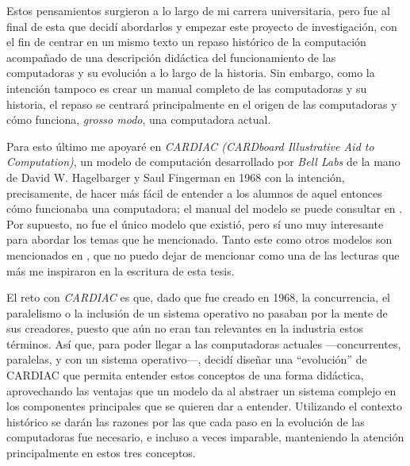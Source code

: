\documentclass[letterpaper,12pt,oneside]{book}
\begin{document}
	Estos pensamientos surgieron a lo largo de mi carrera universitaria, pero fue al final de esta que decidí abordarlos y empezar este proyecto de investigación,
	con el fin de centrar en un mismo texto un repaso histórico de la computación acompañado de una descripción didáctica del funcionamiento de las computadoras
	y su evolución a lo largo de la historia. Sin embargo, como la intención tampoco es crear un manual completo de las computadoras y su historia, el repaso
	se centrará principalmente en el origen de las computadoras y cómo funciona, \textit{grosso modo}, una computadora actual.
 
    Para esto último me apoyaré
	en \textit{CARDIAC (CARDboard Illustrative Aid to Computation)}, un modelo de computación 
	desarrollado por \textit{Bell Labs} de la mano de David W. Hagelbarger y Saul Fingerman en 1968 con la intención, precisamente,
	de hacer más fácil de entender a los alumnos de aquel entonces cómo funcionaba una computadora; el manual del modelo se puede consultar
	en \cite{fingerman_instruction_1968}. 
    Por supuesto, no fue el único modelo que existió, pero sí uno muy interesante para abordar
    los temas que he mencionado. Tanto este como otros
    modelos son mencionados en \cite{mark_jones_lorenzo_paper_2017}, que
	no puedo dejar de mencionar como una de las lecturas que más me inspiraron en la escritura de esta tesis.
	
	El reto con \textit{CARDIAC} es que, dado que fue creado en 1968, la concurrencia, el paralelismo o
	la inclusión de un sistema operativo no pasaban por la mente de sus creadores, puesto que aún no eran tan relevantes en la industria estos términos. Así que,
	para poder llegar a las computadoras actuales —concurrentes, paralelas, y con un sistema operativo—, decidí diseñar una ``evolución'' de CARDIAC que permita
	entender estos conceptos de una forma didáctica, aprovechando las ventajas que un modelo da al abstraer un sistema complejo en los componentes principales
	que se quieren dar a entender. Utilizando el contexto histórico se darán las razones por las que cada paso en la evolución de las
	computadoras fue necesario, e incluso a veces imparable, manteniendo la atención principalmente en estos tres conceptos.
	 
\end{document}
